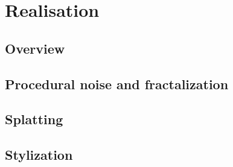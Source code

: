 \chapter{Realisation}


\section{Overview}



\section{Procedural noise and fractalization}

\section{Splatting}


\section{Stylization}
